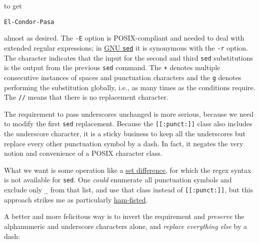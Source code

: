 \documentclass[
  a4paper,
]{article}
\newenvironment{Shaded}{\begin{snugshade}}{\end{snugshade}}
\newcommand{\AttributeTok}[1]{\textcolor[rgb]{0.80,0.80,0.80}{#1}}
\newcommand{\DataTypeTok}[1]{\textcolor[rgb]{0.87,0.87,0.75}{#1}}
\newcommand{\FunctionTok}[1]{\textcolor[rgb]{0.94,0.94,0.56}{#1}}
\newcommand{\KeywordTok}[1]{\textcolor[rgb]{0.94,0.87,0.69}{#1}}
\newcommand{\OperatorTok}[1]{\textcolor[rgb]{0.94,0.94,0.82}{#1}}
\newcommand{\StringTok}[1]{\textcolor[rgb]{0.80,0.58,0.58}{#1}}
\begin{document}
to get

\begin{verbatim}
El-Condor-Pasa
\end{verbatim}

almost as desired. The \texttt{-E} option is POSIX-compliant and needed
to deal with extended regular expressions; in
\href{https://www.gnu.org/software/sed/manual/html_node/Command_002dLine-Options.html}{GNU
\texttt{sed}} it is synonymous with the \texttt{-r} option. The
\texttt{\textbar{}} character indicates that the input for the second
and third \texttt{sed} substitutions is the output from the previous
\texttt{sed} command. The \texttt{+} denotes multiple consecutive
instances of spaces and punctuation characters and the \texttt{g}
denotes performing the substitution globally, i.e., as many times as the
conditions require. The \texttt{//} means that there is no replacement
character.

The requirement to pass underscores unchanged is more serious, because
we need to modify the first \texttt{sed} replacement. Because the
\texttt{{[}{[}:punct:{]}{]}} class also includes the underscore
character, it is a sticky business to keep all the underscores but
replace every other punctuation symbol by a dash. In fact, it negates
the very notion and convenience of a POSIX character class.

What we want is some operation like a
\href{https://mathworld.wolfram.com/SetDifference.html}{set difference},
for which the regex syntax is not available for \texttt{sed}. One
\emph{could} enumerate all punctuation symbols and exclude only
\texttt{\_} from that list, and use that class instead of
\texttt{{[}{[}:punct:{]}{]}}, but this approach strikes me as
particularly
\href{https://idioms.thefreedictionary.com/Ham+Fisted}{ham-fisted}.

A better and more felicitous way is to invert the requirement and
\emph{preserve} the alphanumeric and underscore characters alone, and
\emph{replace everything else} by a dash:

\begin{Shaded}
\end{Shaded}
\end{document}
